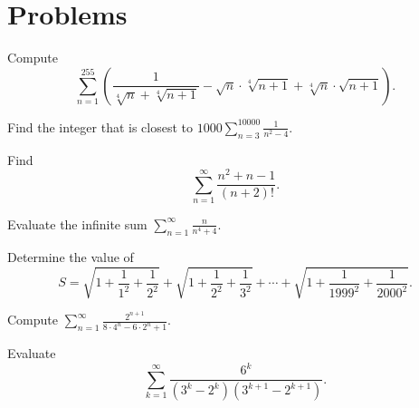 \documentclass{article}
\begin{document}
\pagebreak

\section{Problems}



\begin{prob}[TrinMaC 2020/14]{2}
Compute \[\sum\limits_{n=1}^{255}\left(\frac{1}{\sqrt[4]{n}+\sqrt[4]{n+1}}-\sqrt{n}\cdot \sqrt[4]{n+1}+\sqrt[4]{n}\cdot \sqrt{n+1}\right).\]
\end{prob}

\begin{prob}[AIME II 2002/6]{2}
Find the integer that is closest to $1000\sum\limits_{n=3}^{10000}\frac{1}{n^2-4}$.
\end{prob}


\begin{prob}[Alcumus]{2}
Find \[\sum_{n = 1}^\infty \frac{n^2 + n - 1}{(n + 2)!}.\]
\end{prob}


\begin{req}[HMMT 2008]{3}
Evaluate the infinite sum $\sum\limits_{n=1}^{\infty}\frac{n}{n^4+4}$.
\end{req}


\begin{prob}[USAMTS 1999]{3}
Determine the value of
\[S=\sqrt{1+\frac{1}{1^2}+\frac{1}{2^2}}+\sqrt{1+\frac{1}{2^2}+\frac{1}{3^2}}+\cdots+\sqrt{1+\frac{1}{1999^2}+\frac{1}{2000^2}}.\]
\end{prob}


\begin{prob}[CHMMC 2016/4]{3}
Compute $\sum\limits_{n=1}^{\infty} \frac{2^{n+1}}{8\cdot 4^n-6\cdot 2^n+1}.$
\end{prob}

\begin{prob}[]{4}
Evaluate \[\sum\limits_{k=1}^{\infty} \frac{6^k}{(3^k-2^k)(3^{k+1}-2^{k+1})}.\]
\end{prob}
\end{document}
